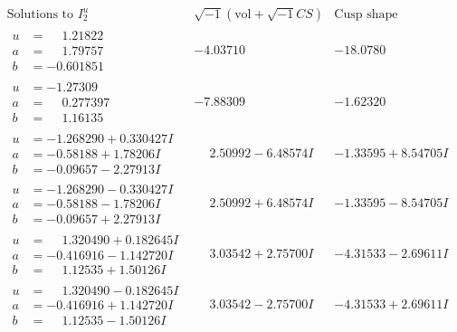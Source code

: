 \documentclass[1p]{elsarticle_modified}
\theoremstyle{definition}
\newcommand{\I}{\sqrt{-1}}
\begin{document}
$$\begin{array}{c|c|c}  
\text{Solutions to }I^u_{2}& \I (\text{vol} + \sqrt{-1}CS) & \text{Cusp shape}\\
 \hline 
\begin{aligned}
u &= \phantom{-}1.21822\phantom{ +0.000000I} \\
a &= \phantom{-}1.79757\phantom{ +0.000000I} \\
b &= -0.601851\phantom{ +0.000000I}\end{aligned}
 & -4.03710\phantom{ +0.000000I} & -18.0780\phantom{ +0.000000I} \\ \hline\begin{aligned}
u &= -1.27309\phantom{ +0.000000I} \\
a &= \phantom{-}0.277397\phantom{ +0.000000I} \\
b &= \phantom{-}1.16135\phantom{ +0.000000I}\end{aligned}
 & -7.88309\phantom{ +0.000000I} & -1.62320\phantom{ +0.000000I} \\ \hline\begin{aligned}
u &= -1.268290 + 0.330427 I \\
a &= -0.58188 + 1.78206 I \\
b &= -0.09657 - 2.27913 I\end{aligned}
 & \phantom{-}2.50992 - 6.48574 I & -1.33595 + 8.54705 I \\ \hline\begin{aligned}
u &= -1.268290 - 0.330427 I \\
a &= -0.58188 - 1.78206 I \\
b &= -0.09657 + 2.27913 I\end{aligned}
 & \phantom{-}2.50992 + 6.48574 I & -1.33595 - 8.54705 I \\ \hline\begin{aligned}
u &= \phantom{-}1.320490 + 0.182645 I \\
a &= -0.416916 - 1.142720 I \\
b &= \phantom{-}1.12535 + 1.50126 I\end{aligned}
 & \phantom{-}3.03542 + 2.75700 I & -4.31533 - 2.69611 I \\ \hline\begin{aligned}
u &= \phantom{-}1.320490 - 0.182645 I \\
a &= -0.416916 + 1.142720 I \\
b &= \phantom{-}1.12535 - 1.50126 I\end{aligned}
 & \phantom{-}3.03542 - 2.75700 I & -4.31533 + 2.69611 I \\ \hline\begin{aligned}

\end{aligned}
\end{array}$$
\end{document}
